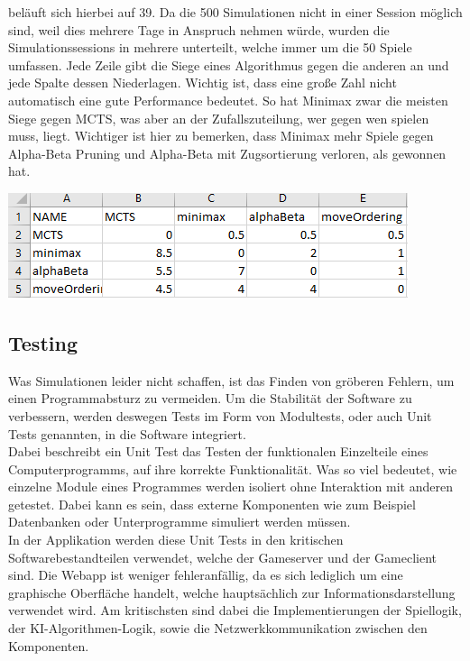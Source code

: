 \documentclass[12pt,a4paper,bibliography=totocnumbered,listof=totocnumbered]{article}
\begin{document}
beläuft sich hierbei auf 39. Da die 500 Simulationen nicht in einer Session möglich sind, weil dies mehrere Tage in Anspruch nehmen würde,
wurden die Simulationssessions in mehrere unterteilt, welche immer um die 50 Spiele umfassen.
Jede Zeile gibt die Siege eines Algorithmus gegen die anderen an und jede Spalte dessen Niederlagen.
Wichtig ist, dass eine große Zahl nicht automatisch eine gute Performance bedeutet. So hat Minimax zwar die meisten
Siege gegen MCTS, was aber an der Zufallszuteilung, wer gegen wen spielen muss, liegt. Wichtiger ist hier zu bemerken, dass Minimax mehr Spiele 
gegen Alpha-Beta Pruning und Alpha-Beta mit Zugsortierung verloren, als gewonnen hat.


\vspace{1em}
\begin{minipage}{\linewidth}
	\centering
	\includegraphics[width=0.7\linewidth]{pics/ExcelSimulation.png}
	\label{fig:ExcelSimulation}
\end{minipage}


\subsection{Testing}
Was Simulationen leider nicht schaffen, ist das Finden von gröberen Fehlern, um einen Programmabsturz zu vermeiden.
Um die Stabilität der Software zu verbessern, werden deswegen Tests im Form von Modultests, oder auch Unit Tests genannten, in die Software integriert.
\\
Dabei beschreibt ein Unit Test das Testen der funktionalen Einzelteile eines Computerprogramms, auf ihre korrekte Funktionalität. 
Was so viel bedeutet, wie einzelne Module eines Programmes werden isoliert ohne Interaktion mit anderen getestet. 
Dabei kann es sein, dass externe Komponenten wie zum Beispiel Datenbanken oder Unterprogramme simuliert werden müssen. \cite{UnitTestBook}
\\
In der Applikation werden diese Unit Tests in den kritischen Softwarebestandteilen verwendet, welche der Gameserver und der Gameclient sind.
Die Webapp ist weniger fehleranfällig, da es sich lediglich um eine graphische Oberfläche handelt, welche hauptsächlich zur Informationsdarstellung verwendet wird.
Am kritischsten sind dabei die Implementierungen der Spiellogik, der KI-Algorithmen-Logik, sowie die Netzwerkkommunikation zwischen den Komponenten. 
\end{document}
